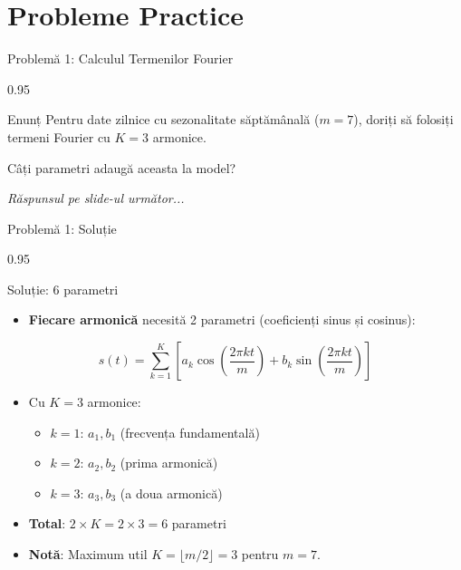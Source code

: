 \documentclass[9pt, aspectratio=169, t]{beamer}
\begin{document}
\section{Probleme Practice}

\begin{frame}{Problemă 1: Calculul Termenilor Fourier}
    \begin{cminipage}{0.95\textwidth}
    \begin{block}{Enunț}
        Pentru date zilnice cu sezonalitate săptămânală ($m=7$), doriți să folosiți termeni Fourier cu $K=3$ armonice.

        \vspace{0.2cm}
        Câți parametri adaugă aceasta la model?
    \end{block}

    \vspace{0.5cm}
    \begin{flushright}\textit{Răspunsul pe slide-ul următor...}\end{flushright}
    \end{cminipage}
\end{frame}

\begin{frame}{Problemă 1: Soluție}
    \begin{cminipage}{0.95\textwidth}
    \begin{exampleblock}{Soluție: 6 parametri}
        \begin{itemize}\setlength{\itemsep}{0pt}
            \item \textbf{Fiecare armonică} necesită 2 parametri (coeficienți sinus și cosinus):
        \end{itemize}
        $$s(t) = \sum_{k=1}^{K} \left[ a_k \cos\left(\frac{2\pi k t}{m}\right) + b_k \sin\left(\frac{2\pi k t}{m}\right) \right]$$

        \begin{itemize}\setlength{\itemsep}{0pt}
            \item Cu $K=3$ armonice:
            \begin{itemize}\setlength{\itemsep}{0pt}
                \item $k=1$: $a_1, b_1$ (frecvența fundamentală)
                \item $k=2$: $a_2, b_2$ (prima armonică)
                \item $k=3$: $a_3, b_3$ (a doua armonică)
            \end{itemize}
            \item \textbf{Total}: $2 \times K = 2 \times 3 = 6$ parametri
            \item \textbf{Notă}: Maximum util $K = \lfloor m/2 \rfloor = 3$ pentru $m=7$.
        \end{itemize}
    \end{exampleblock}
    \end{cminipage}
\end{frame}
\end{document}
